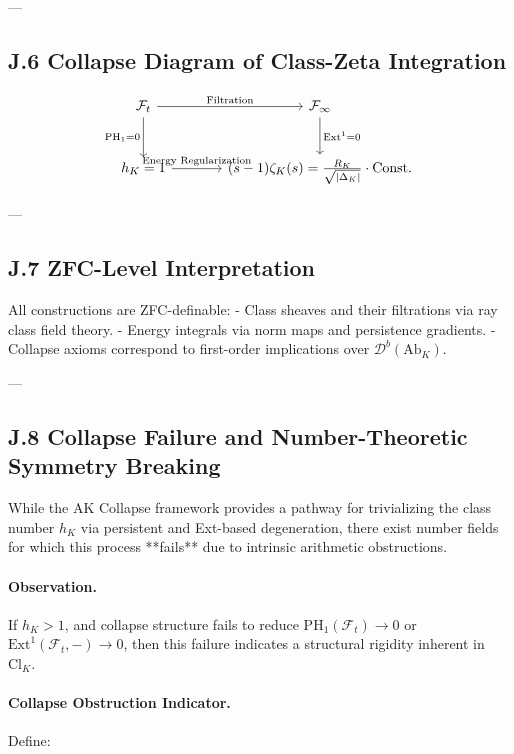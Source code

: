 \documentclass[11pt]{article}
\begin{document}
---

\subsection*{J.6 Collapse Diagram of Class-Zeta Integration}

\[
\begin{tikzcd}[column sep=large, row sep=large]
\mathcal{F}_t \arrow[r, "\text{Filtration}"] \arrow[d, "\mathrm{PH}_1 = 0"'] 
& \mathcal{F}_\infty \arrow[d, "\mathrm{Ext}^1 = 0"] \\
h_K = 1 \arrow[r, "\text{Energy Regularization}"] 
& (s - 1)\zeta_K(s) = \frac{R_K}{\sqrt{|\Delta_K|}} \cdot \text{Const.}
\end{tikzcd}
\]

---

\subsection*{J.7 ZFC-Level Interpretation}

All constructions are ZFC-definable:
- Class sheaves and their filtrations via ray class field theory.
- Energy integrals via norm maps and persistence gradients.
- Collapse axioms correspond to first-order implications over $\mathcal{D}^b(\text{Ab}_K)$.

---

\subsection*{J.8 Collapse Failure and Number-Theoretic Symmetry Breaking}

While the AK Collapse framework provides a pathway for trivializing the class number \( h_K \) via persistent and Ext-based degeneration, there exist number fields for which this process **fails** due to intrinsic arithmetic obstructions.

\paragraph{Observation.}
If \( h_K > 1 \), and collapse structure fails to reduce \( \mathrm{PH}_1(\mathcal{F}_t) \to 0 \) or \( \mathrm{Ext}^1(\mathcal{F}_t, -) \to 0 \), then this failure indicates a structural rigidity inherent in \( \mathrm{Cl}_K \).

\paragraph{Collapse Obstruction Indicator.}
Define:
\end{document}
